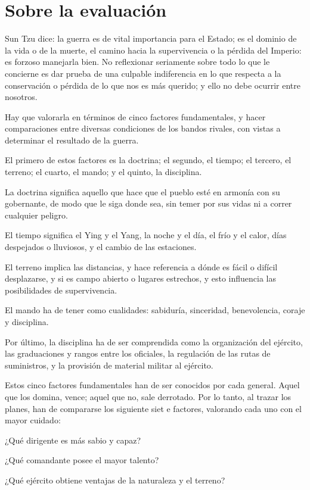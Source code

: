 \chapter{Sobre la evaluación}

Sun Tzu dice: la guerra es de vital importancia para el Estado; es el dominio de la vida o de la muerte, el camino hacia la supervivencia o la pérdida del Imperio: es forzoso manejarla bien. No reflexionar seriamente sobre todo lo que le concierne es dar prueba de una culpable indiferencia en lo que respecta a la conservación o pérdida de lo que nos es más querido; y ello no debe ocurrir entre nosotros.

Hay que valorarla en términos de cinco factores fundamentales, y hacer comparaciones entre diversas condiciones de los bandos rivales, con vistas a determinar el resultado de la guerra.

El primero de estos factores es la doctrina; el segundo, el tiempo; el tercero, el terreno; el cuarto, el mando; y el quinto, la disciplina.

La doctrina significa aquello que hace que el pueblo esté en armonía con su gobernante, de modo que le siga donde sea, sin temer por sus vidas ni a correr cualquier peligro.

El tiempo significa el Ying y el Yang, la noche y el día, el frío y el calor, días despejados o lluviosos, y el cambio de las estaciones.

El terreno implica las distancias, y hace referencia a dónde es fácil o difícil desplazarse, y si es campo abierto o lugares estrechos, y esto influencia las posibilidades de supervivencia.

El mando ha de tener como cualidades: sabiduría, sinceridad, benevolencia, coraje y disciplina.

Por último, la disciplina ha de ser comprendida como la organización del ejército, las graduaciones y rangos entre los oficiales, la regulación de las rutas de suministros, y la provisión de material militar al ejército.

Estos cinco factores fundamentales han de ser conocidos por cada general. Aquel que los domina, vence; aquel que no, sale derrotado. Por lo tanto, al trazar los planes, han de compararse los siguiente siet e factores, valorando cada uno con el mayor cuidado:

¿Qué dirigente es más sabio y capaz?

¿Qué comandante posee el mayor talento?
 
¿Qué ejército obtiene ventajas de la naturaleza y el terreno?

